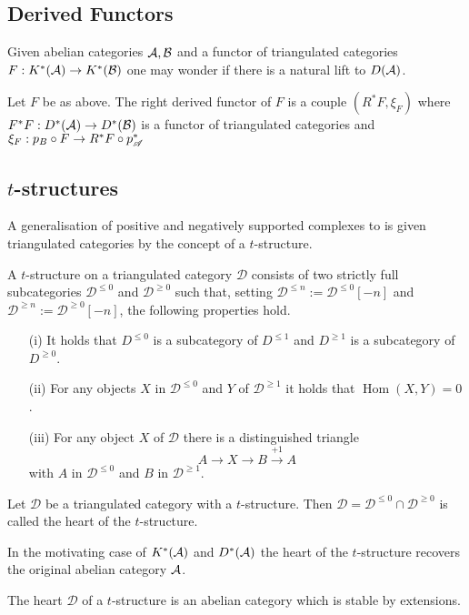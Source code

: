 \subsection{Derived Functors}
Given abelian categories $\AA, \mathcal{B}$ and a functor of triangulated categories $F:K^*(\AA)\to K^*(\mathcal{B})$ one may wonder if there is a natural lift to $D(\AA)$.
\begin{definition}
  Let $F$ be as above. The right derived functor of $F$ is a couple $(R^*F,\xi_F)$ where $F^*F:D^*(\AA) \to D^*(\mathcal{B})$ is a functor of triangulated categories and $\xi_F:p_B\circ F \to R^*F \circ p_\A^*$
\end{definition}
\subsection{$t$-structures}
A generalisation of positive and negatively supported complexes to is given triangulated categories by the concept of a $t$-structure.
\begin{definition}
  A $t$-structure on a triangulated category $\mathcal{D}$ consists of two strictly full subcategories $\mathcal{D}^{\leq 0}$ and $\mathcal{D}^{\geq 0}$ such that, setting $\mathcal{D}^{\leq n} := \mathcal{D}^{\leq 0}[-n]$ and $\mathcal{D}^{\geq n} := \mathcal{D}^{\geq 0} [-n]$, the following properties hold.
  \begin{enumerate}
    \item[(i)] It holds that $D^{\leq 0}$ is a subcategory of $D^{\leq 1}$ and $D^{\geq 1}$ is a subcategory of $D^{\geq 0}$.
    \item[(ii)] For any objects $X$ in $\mathcal{D}^{\leq 0}$ and $Y$ of $\mathcal{D}^{\geq 1}$ it holds that $\operatorname{Hom}(X,Y) = 0$.
    \item[(iii)] For any object $X$ of $\mathcal{D}$ there is a distinguished triangle
    $$A \to X \to B \xrightarrow{+1} A $$
    with $A$ in $\mathcal{D}^{\leq 0}$ and $B$ in $\mathcal{D}^{\geq 1}$.
  \end{enumerate}
\end{definition}
\begin{definition}
  Let $\mathcal{D}$ be a triangulated category with a $t$-structure. Then $\mathcal{D} = \mathcal{D}^{\leq 0} \cap \mathcal{D}^{\geq 0}$ is called the heart of the $t$-structure.
\end{definition}
In the motivating case of $K^*(\AA)$ and $D^*(\AA)$ the heart of the $t$-structure recovers the original abelian category $\AA$.
\begin{proposition}
  The heart $\mathcal{D}$ of a $t$-structure is an abelian category which is stable by extensions.
\end{proposition}
